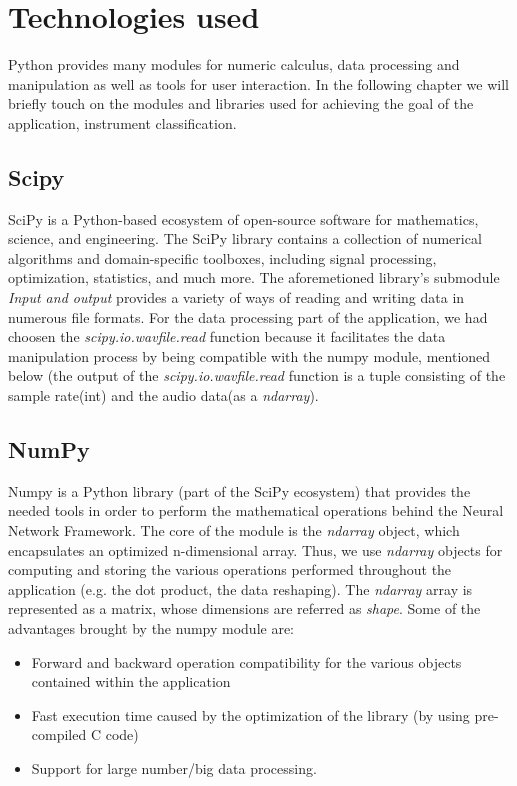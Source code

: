 \chapter{Technologies used}
Python provides many modules for numeric calculus, data processing and manipulation as  well as tools for user interaction.
In the following chapter we will briefly touch on the modules and libraries used for achieving the goal
of the application, instrument classification.

\section{Scipy}
SciPy is a Python-based ecosystem of open-source software for mathematics, science, and engineering. The SciPy library contains a collection of numerical algorithms and domain-specific toolboxes, including signal processing, optimization, statistics, and much more.\cite{scpd}
The aforemetioned library's submodule \textit{Input and output} provides a variety of ways of reading and writing data in numerous file formats. For the data processing part of the application, we had choosen the \textit{scipy.io.wavfile.read} function because it facilitates the data manipulation process by being compatible with the numpy module, mentioned below (the output of the \textit{scipy.io.wavfile.read} function is a tuple consisting of the sample rate(int) and the audio data(as a \textit{ndarray}).
\section{NumPy}
Numpy is a Python library (part of the SciPy ecosystem) that provides the needed tools in order to perform the mathematical operations behind
the Neural Network Framework. The core of the module is the \textit{ndarray} object, which encapsulates an
optimized n-dimensional array. Thus, we use \textit{ndarray} objects for computing and storing the various
operations performed throughout the application (e.g. the dot product, the data reshaping). The \textit{ndarray}
array is represented as a matrix, whose dimensions are referred as \textit{shape}.
Some of the advantages brought by the numpy module are:
\begin{itemize}
	\item Forward and backward operation compatibility for the various objects contained within the application
	\item Fast execution time caused by the optimization of the library \cite{npd} (by using pre-compiled C code)
	\item Support for large number/big data processing.
\end{itemize}

